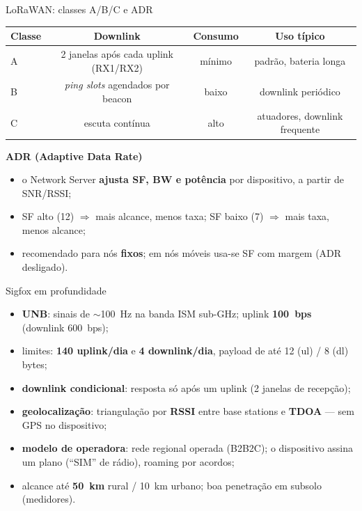 \documentclass[aspectratio=169,11pt]{beamer}
\begin{document}
\begin{frame}{LoRaWAN: classes A/B/C e ADR}
  \begin{center}
    \scriptsize
    \begin{tabular}{@{}lccc@{}}
      \toprule
      \textbf{Classe} & \textbf{Downlink} & \textbf{Consumo} & \textbf{Uso típico}\\
      \midrule
      A & 2 janelas após cada uplink (RX1/RX2) & mínimo & padrão, bateria longa\\
      B & \emph{ping slots} agendados por beacon & baixo & downlink periódico\\
      C & escuta contínua & alto & atuadores, downlink frequente\\
      \bottomrule
    \end{tabular}
  \end{center}
  \vspace{0.2cm}
  \textbf{ADR (Adaptive Data Rate)}
  \begin{itemize}
    \item o Network Server \textbf{ajusta SF, BW e potência} por dispositivo, a partir de SNR/RSSI;
    \item SF alto (12) $\Rightarrow$ mais alcance, menos taxa; SF baixo (7) $\Rightarrow$ mais taxa, menos alcance;
    \item recomendado para nós \textbf{fixos}; em nós móveis usa-se SF com margem (ADR desligado).
  \end{itemize}
\end{frame}

\begin{frame}{Sigfox em profundidade}
  \begin{itemize}
    \item \textbf{UNB}: sinais de $\sim$100~Hz na banda ISM sub-GHz; uplink \textbf{100~bps} (downlink 600~bps);
    \item limites: \textbf{140 uplink/dia} e \textbf{4 downlink/dia}, payload de até 12 (ul) / 8 (dl) bytes;
    \item \textbf{downlink condicional}: resposta só após um uplink (2 janelas de recepção);
    \item \textbf{geolocalização}: triangulação por \textbf{RSSI} entre base stations e \textbf{TDOA} --- sem GPS no dispositivo;
    \item \textbf{modelo de operadora}: rede regional operada (B2B2C); o dispositivo assina um plano (``SIM'' de rádio), roaming por acordos;
    \item alcance até \textbf{50~km} rural / 10~km urbano; boa penetração em subsolo (medidores).
  \end{itemize}
\end{frame}
\end{document}
